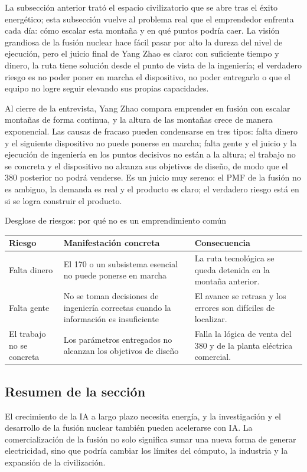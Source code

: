 La subsección anterior trató el espacio civilizatorio que se abre tras el éxito energético; esta subsección vuelve al problema real que el emprendedor enfrenta cada día: cómo escalar esta montaña y en qué puntos podría caer. La visión grandiosa de la fusión nuclear hace fácil pasar por alto la dureza del nivel de ejecución, pero el juicio final de Yang Zhao es claro: con suficiente tiempo y dinero, la ruta tiene solución desde el punto de vista de la ingeniería; el verdadero riesgo es no poder poner en marcha el dispositivo, no poder entregarlo o que el equipo no logre seguir elevando sus propias capacidades.

Al cierre de la entrevista, Yang Zhao compara emprender en fusión con escalar montañas de forma continua, y la altura de las montañas crece de manera exponencial. Las causas de fracaso pueden condensarse en tres tipos: falta dinero y el siguiente dispositivo no puede ponerse en marcha; falta gente y el juicio y la ejecución de ingeniería en los puntos decisivos no están a la altura; el trabajo no se concreta y el dispositivo no alcanza sus objetivos de diseño, de modo que el 380 posterior no podrá venderse. Es un juicio muy sereno: el PMF de la fusión no es ambiguo, la demanda es real y el producto es claro; el verdadero riesgo está en si se logra construir el producto.

\begin{knowledgebox}{Desglose de riesgos: por qué no es un emprendimiento común}
\begin{tabularx}{\textwidth}{p{}p{}X}
\toprule
Riesgo & Manifestación concreta & Consecuencia \\
\midrule
Falta dinero & El 170 o un subsistema esencial no puede ponerse en marcha & La ruta tecnológica se queda detenida en la montaña anterior. \\
Falta gente & No se toman decisiones de ingeniería correctas cuando la información es insuficiente & El avance se retrasa y los errores son difíciles de localizar. \\
El trabajo no se concreta & Los parámetros entregados no alcanzan los objetivos de diseño & Falla la lógica de venta del 380 y de la planta eléctrica comercial. \\
\bottomrule
\end{tabularx}
\end{knowledgebox}

\subsection{Resumen de la sección}

El crecimiento de la IA a largo plazo necesita energía, y la investigación y el desarrollo de la fusión nuclear también pueden acelerarse con IA. La comercialización de la fusión no solo significa sumar una nueva forma de generar electricidad, sino que podría cambiar los límites del cómputo, la industria y la expansión de la civilización.
